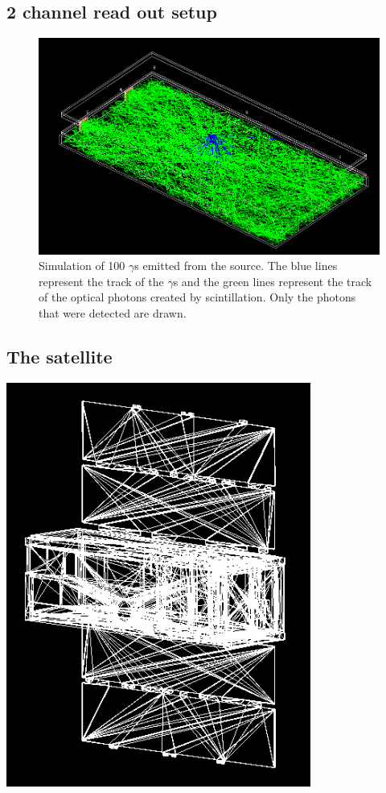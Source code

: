 \documentclass[12pt, a4paper,titlepage]{article}
\numberwithin{equation}{section}
\numberwithin{figure}{section}
\begin{document}
\subsection{2 channel read out setup}

\begin{figure}[H]
\includegraphics[width=160.0mm]{images/2channel.png}
\caption{Simulation of 100 $\gamma$s emitted from the source. The blue lines represent the track of the $\gamma$s and the green lines represent the track of the optical photons created by scintillation. Only the photons that were detected are drawn.}
\end{figure}



\subsection{The satellite}

\includegraphics[width=100.0mm]{images/satellite.png}
\end{document}
